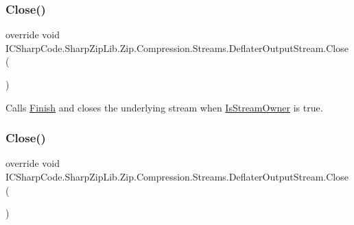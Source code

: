 \subsubsection{\texorpdfstring{Close()}{Close()}\hspace{0.1cm}{\footnotesize\ttfamily [1/2]}}
{\footnotesize\ttfamily override void I\+C\+Sharp\+Code.\+Sharp\+Zip\+Lib.\+Zip.\+Compression.\+Streams.\+Deflater\+Output\+Stream.\+Close (\begin{DoxyParamCaption}{ }\end{DoxyParamCaption})\hspace{0.3cm}{\ttfamily [inline]}}



Calls \hyperlink{class_i_c_sharp_code_1_1_sharp_zip_lib_1_1_zip_1_1_compression_1_1_streams_1_1_deflater_output_stream_ac81f3e741a1ffdf98c02a171ad7cb334}{Finish} and closes the underlying stream when \hyperlink{class_i_c_sharp_code_1_1_sharp_zip_lib_1_1_zip_1_1_compression_1_1_streams_1_1_deflater_output_stream_a741aa9d79b2ebbb0fcd88d951935fd88}{Is\+Stream\+Owner} is true. 

\mbox{\label{class_i_c_sharp_code_1_1_sharp_zip_lib_1_1_zip_1_1_compression_1_1_streams_1_1_deflater_output_stream_a9c7b7ad6415b77846d1a68e87ae55b8e}} 
\subsubsection{\texorpdfstring{Close()}{Close()}\hspace{0.1cm}{\footnotesize\ttfamily [2/2]}}
{\footnotesize\ttfamily override void I\+C\+Sharp\+Code.\+Sharp\+Zip\+Lib.\+Zip.\+Compression.\+Streams.\+Deflater\+Output\+Stream.\+Close (\begin{DoxyParamCaption}{ }\end{DoxyParamCaption})\hspace{0.3cm}{\ttfamily [inline]}}



